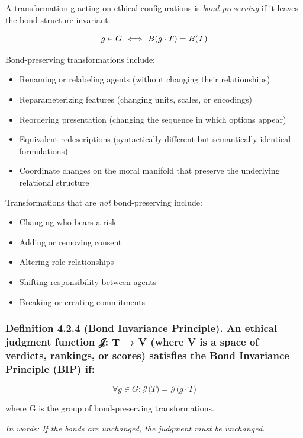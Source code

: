 \documentclass[12pt]{article}
\theoremstyle{plain}
\theoremstyle{definition}
\theoremstyle{remark}
\begin{document}
A transformation g acting on ethical configurations is
\emph{bond-preserving} if it leaves the bond structure invariant:

\[g \in G\text{\:\,} \Longleftrightarrow \text{\:\,}B(g \cdot T) = B(T)
\]

Bond-preserving transformations include:

\begin{itemize}
\item
  Renaming or relabeling agents (without changing their relationships)
\item
  Reparameterizing features (changing units, scales, or encodings)
\item
  Reordering presentation (changing the sequence in which options
  appear)
\item
  Equivalent redescriptions (syntactically different but semantically
  identical formulations)
\item
  Coordinate changes on the moral manifold that preserve the underlying
  relational structure
\end{itemize}

Transformations that are \emph{not} bond-preserving include:

\begin{itemize}
\item
  Changing who bears a risk
\item
  Adding or removing consent
\item
  Altering role relationships
\item
  Shifting responsibility between agents
\item
  Breaking or creating commitments
\end{itemize}

\subsubsection{Definition 4.2.4 (Bond Invariance Principle). An ethical
judgment function 𝒥: T → V (where V is a space of verdicts, rankings, or
scores) satisfies the Bond Invariance Principle (BIP)
if:}\label{definition-4.2.4-bond-invariance-principle.-an-ethical-judgment-function-ux1d4a5-t-v-where-v-is-a-space-of-verdicts-rankings-or-scores-satisfies-the-bond-invariance-principle-bip-if}

\[\boxed{\forall g \in G:\mathcal{J(}T) = \mathcal{J(}g \cdot T)}
\]

where G is the group of bond-preserving transformations.

\emph{In words: If the bonds are unchanged, the judgment must be
unchanged.}
\end{document}
